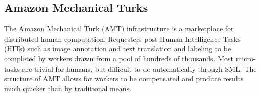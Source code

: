 \subsection{Amazon Mechanical Turks}
The Amazon Mechanical Turk (AMT) infrastructure is a marketplace for distributed human computation.  Requesters post Human Intelligence Tasks (HITs) such as image annotation and text translation and labeling to be completed by workers drawn from a pool of hundreds of thousands.  Most micro-tasks are trivial for humans, but difficult to do automatically through SML.  The structure of AMT allows for workers to be compensated and produce results much quicker than by traditional means.
